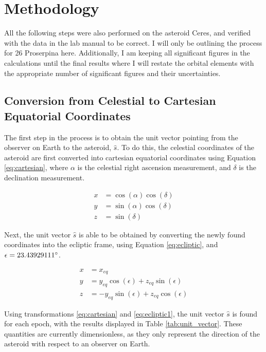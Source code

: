 \documentclass{article}
\begin{document}
\section{Methodology}
All the following steps were also performed on the asteroid Ceres, and verified with the data in the lab manual to be correct. I will only be outlining the 
process for 26 Proserpina here. Additionally, I am keeping all significant figures in the calculations until the final results where I will restate the orbital elements with 
the appropriate number of significant figures and their uncertainties.
\subsection{Conversion from Celestial to Cartesian Equatorial Coordinates}

The first step in the process is to obtain the unit vector pointing from the observer on Earth to the asteroid, $\hat{s}$. To do this, the celestial coordinates of the 
asteroid are first converted into cartesian equatorial coordinates using Equation \ref{eq:cartesian}, where $\alpha$ is the celestial right ascension measurement, and 
$\delta$ is the declination measurement.

\begin{equation}
    \begin{aligned}
        \label{eq:cartesian}
        x &= \cos(\alpha)\cos(\delta) \\
        y &= \sin(\alpha)\cos(\delta) \\
        z &= \sin(\delta)
    \end{aligned}
\end{equation}

\noindent
Next, the unit vector $\hat{s}$ is able to be obtained by converting the newly found coordinates into the ecliptic frame, 
using Equation \ref{eq:ecliptic}, and $\epsilon = 23.43929111 \degree$.

\begin{equation}
    \label{eq:ecliptic1}
    \begin{aligned}
        x &= x_{eq} \\
        y &= y_{eq}\cos(\epsilon) + z_{eq}\sin(\epsilon) \\
        z &= -y_{eq}\sin(\epsilon) + z_{eq}\cos(\epsilon)
    \end{aligned}
\end{equation}

\noindent
Using transformations \ref{eq:cartesian} and \ref{eq:ecliptic1}, the unit vector $\hat{s}$ is found for each epoch, with the results displayed in Table \ref{tab:unit_vector}. These 
quantities are currently dimensionless, as they only represent the direction of the asteroid with respect to an observer on Earth. 
\end{document}
